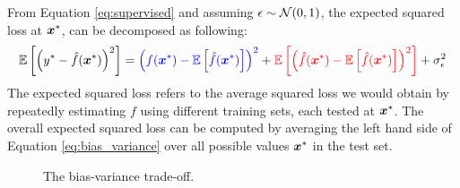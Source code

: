 \begin{theorem}
	From Equation \ref{eq:supervised} and assuming $\epsilon \sim \mathcal{N}(0, 1)$,
	the expected squared loss at
	$\boldsymbol{x}^*$, can be decomposed as following:
	\begin{equation}
		\label{eq:bias_variance}
		\mathbb{E}\left[\left(y^* - \hat{f}(\boldsymbol{x}^*)\right)^2\right]
		=
		\color{blue}\left(f(\boldsymbol{x}^*) - \mathbb{E}\left[\hat{f}(\boldsymbol{x}^*)\right]\right)^2
		\color{black}
		+
		\color{red}\mathbb{E}\left[\left(\hat{f}(\boldsymbol{x}^*) - \mathbb{E}\left[\hat{f}(\boldsymbol{x}^*)\right]\right)^2\right]
		\color{black}
		+
		\sigma_{\epsilon}^{2}
	\end{equation}
	The expected squared loss refers to the average squared loss we would obtain
	by repeatedly estimating $f$ using different training sets, each tested at
	$\boldsymbol{x}^*$. The overall expected squared loss can be computed by averaging the
	left hand side of Equation \ref{eq:bias_variance} over all possible values
	$\boldsymbol{x}^*$ in the test set.
\end{theorem}

\begin{figure}
	\centering
	\caption{The bias-variance trade-off.}
	\label{fig:bias_variance}
\end{figure}

%
%
%
%
%
